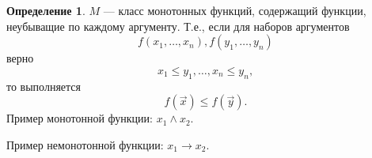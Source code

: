 \documentclass[12pt]{article}
\let\im\rightarrow
\let\la\land
\theoremstyle{definition}
\newtheorem{definition}{Определение}[section]
\theoremstyle{statement}
\theoremstyle{theorem}
\begin{document}
\begin{definition}
  $M$ --- класс монотонных функций, содержащий функции, неубыващие по
  каждому аргументу. Т.е., если для наборов аргументов
  \begin{displaymath}
    f(x_1, \dots, x_n), f(y_1, \dots, y_n)
  \end{displaymath}
  верно
  \begin{displaymath}
    x_1 \leqslant y_1, \dots, x_n \leqslant y_n,
  \end{displaymath}
  то выполняется
  \begin{displaymath}
    f(\vec{x}) \leqslant f(\vec{y}).
  \end{displaymath}
  Пример монотонной функции: $x_1 \la x_2$.

  Пример немонотонной функции: $x_1 \im x_2$.
\end{definition}
\end{document}
